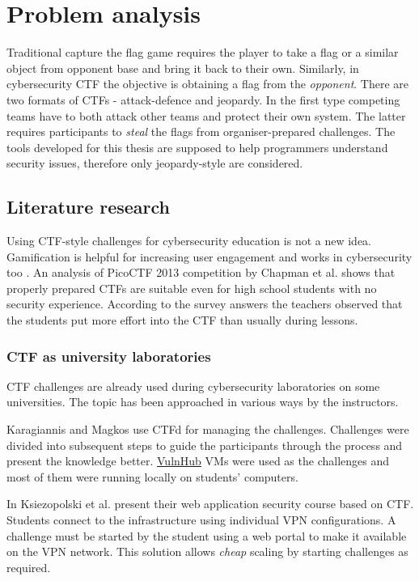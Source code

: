 \chapter{Problem analysis}

Traditional capture the flag game requires the player to take a flag or a similar object from opponent base and bring it back to their own. Similarly, in cybersecurity CTF the objective is obtaining a flag from the \textit{opponent}. There are two formats of CTFs - attack-defence and jeopardy. In the first type competing teams have to both attack other teams and protect their own system. The latter requires participants to \textit{steal} the flags from organiser-prepared challenges. The tools developed for this thesis are supposed to help programmers understand security issues, therefore only jeopardy-style are considered.

\section{Literature research}

Using CTF-style challenges for cybersecurity education is not a new idea. Gamification is helpful for increasing user engagement and works in cybersecurity too \cite{bib:exploring-game-design}. An analysis of PicoCTF 2013 competition by Chapman et al. \cite{bib:picoCTF} shows that properly prepared CTFs are suitable even for high school students with no security experience. According to the survey answers the teachers observed that the students put more effort into the CTF than usually during lessons.

\subsection{CTF as university laboratories}

CTF challenges are already used during cybersecurity laboratories on some universities. The topic has been approached in various ways by the instructors.

Karagiannis and Magkos \cite{bib:Karagiannis2021} use CTFd for managing the challenges. Challenges were divided into subsequent steps to guide the participants through the process and present the knowledge better. \href{https://vulnhub.com/}{VulnHub} VMs were used as the challenges and most of them were running locally on students' computers.

In \cite{bib:teaching-ctf-PL} Ksiezopolski et al. present their web application security course based on CTF. Students connect to the infrastructure using individual VPN configurations. A challenge must be started by the student using a web portal to make it available on the VPN network. This solution allows \textit{cheap} scaling by starting challenges as required.

